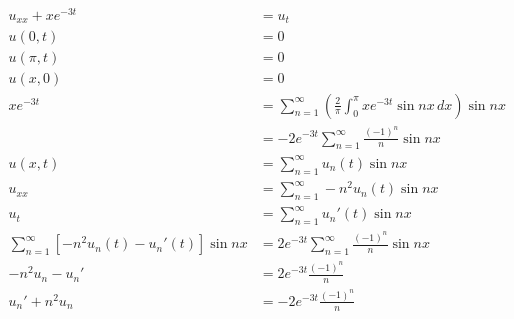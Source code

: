 \documentclass{article}
\begin{document}
\setcounter{subsubsection}{16}
\subsubsection{}

\begin{align*}
  u_{x x} + x e^{-3 t}                                 & = u_t                                                                                            \\
  u(0, t)                                              & = 0                                                                                              \\
  u(\pi, t)                                            & = 0                                                                                              \\
  u(x, 0)                                              & = 0                                                                                              \\
  x e^{-3 t}                                           & = \sum_{n = 1}^\infty \left( \frac{2}{\pi} \int_0^\pi x e^{-3 t} \sin n x \,d x \right) \sin n x \\
                                                       & = -2 e^{-3 t} \sum_{n = 1}^\infty \frac{(-1)^n}{n} \sin n x                                      \\
  u(x, t)                                              & = \sum_{n = 1}^\infty u_n(t) \sin n x                                                            \\
  u_{x x}                                              & = \sum_{n = 1}^\infty -n^2 u_n(t) \sin n x                                                       \\
  u_t                                                  & = \sum_{n = 1}^\infty u_n'(t) \sin n x                                                           \\
  \sum_{n = 1}^\infty [-n^2 u_n(t) - u_n'(t)] \sin n x & = 2 e^{-3 t} \sum_{n = 1}^\infty \frac{(-1)^n}{n} \sin n x                                       \\
  -n^2 u_n - u_n'                                      & = 2 e^{-3 t} \frac{(-1)^n}{n}                                                                    \\
  u_n' + n^2 u_n                                       & = -2 e^{-3 t} \frac{(-1)^n}{n}                                                                   \\

\end{align*}
\end{document}

